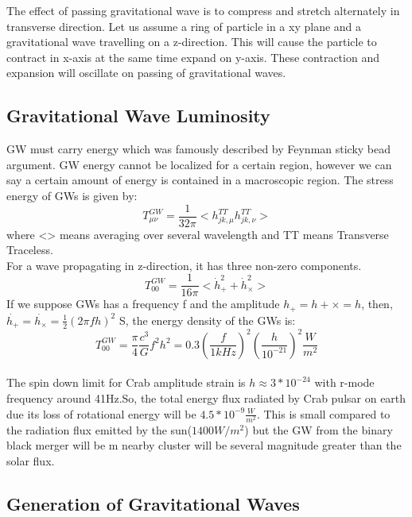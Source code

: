 \documentclass{ttuthes2007}
\begin{document}
	The effect of passing gravitational wave is to compress and stretch
alternately in transverse direction. Let us assume a ring of particle in a xy
plane and a gravitational wave travelling on a z-direction. This will cause the
particle to contract in x-axis at the same time expand on y-axis. These
contraction and expansion will oscillate on passing of gravitational waves. 

\subsection{Gravitational Wave Luminosity}
	\ac{GW} must carry energy which was famously described by Feynman
sticky bead argument. \ac{GW} energy cannot be localized for a certain region,
however we can say a certain amount of energy is contained in a macroscopic
region. The stress energy of \acp{GW} is given by:
\begin{equation}
T_{\mu\nu}^{GW} = \frac{1}{32\pi}<h_{jk,\mu}^{TT}h_{jk,\nu}^{TT}>
\end{equation}
where <> means averaging over several wavelength and TT means Transverse
Traceless.\\
For a wave propagating in z-direction, it has three non-zero components.
\begin{equation}
T_{00}^{GW}=\frac{1}{16\pi}<\dot{h}_+^2+\dot{h}_\times ^2>
\end{equation}
If we suppose \acp{GW} has a frequency f and the amplitude $h_+ = h+\times = h$,
then, $\dot{h_+} = \dot{h_\times} = \frac{1}{2}(2\pi fh)^2$
S, the energy density of the \acp{GW} is:
\begin{equation}
T_{00}^{GW} = \frac{\pi}{4}\frac{c^3}{G}f^2 h^2=0.3\left(\frac{f}{1kHz}\right )^2
\left(\frac{h}{10^{-21}}\right )^2\frac{W}{m^2}
\end{equation}
\\
The spin down limit for Crab amplitude strain is $h\approx3*10^{-24}$ with
r-mode frequency around 41Hz.So, the total energy flux radiated by Crab pulsar
on earth due its loss of rotational energy will be
$4.5*10^{-9}\frac{W}{m^2}$. This is small compared to the radiation flux emitted
by the sun($1400W/m^2$) but the \ac{GW} from the binary black merger will be
m nearby cluster will be several magnitude greater than the solar flux.

\subsection{Generation of Gravitational Waves}
\end{document}
